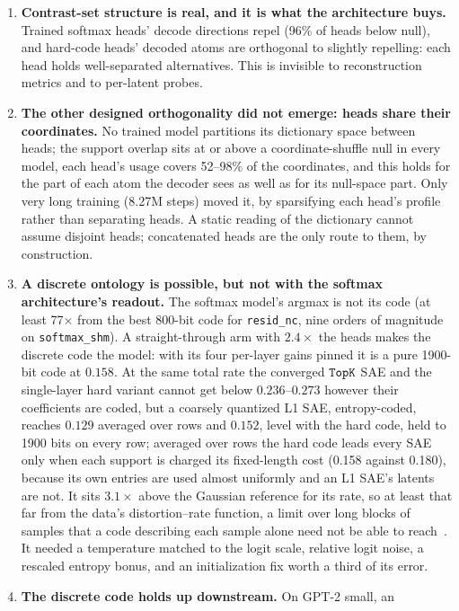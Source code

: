 \begin{enumerate}
\item \textbf{Contrast-set structure is real, and it is what the
architecture buys.} Trained softmax heads' decode directions repel (96\%
of heads below null), and hard-code heads' decoded atoms are orthogonal
to slightly repelling: each head holds well-separated alternatives. This
is invisible to reconstruction metrics and to per-latent probes.
\item \textbf{The other designed orthogonality did not emerge: heads share
their coordinates.} No trained model partitions its dictionary space
between heads; the support overlap sits at or above a coordinate-shuffle
null in every model, each head's usage covers 52--98\% of the coordinates,
and this holds for the part of each atom the decoder sees as well as for
its null-space part. Only very long training (8.27M steps) moved it, by
sparsifying each head's profile rather than separating heads. A static
reading of the dictionary cannot assume disjoint heads; concatenated heads
are the only route to them, by construction.
\item \textbf{A discrete ontology is possible, but not with the softmax
architecture's readout.} The softmax model's argmax is not its code (at
least 77$\times$ from the best 800-bit code for \texttt{resid\_nc}, nine
orders of magnitude on \texttt{softmax\_shm}). A straight-through arm
with $2.4\times$ the heads makes the discrete code the model: with its
four per-layer gains pinned it is a pure 1900-bit code at $0.158$. At the
same total rate the converged $\mathop{\mathtt{TopK}}\limits$ SAE and the single-layer hard
variant cannot get below $0.236$--$0.273$ however their coefficients are
coded, but a coarsely quantized L1 SAE, entropy-coded, reaches $0.129$
averaged over rows and $0.152$, level with the hard code, held to 1900
bits on every row; averaged over rows the hard code leads every SAE only
when each support is charged its fixed-length cost (0.158 against 0.180),
because its own entries are used almost uniformly and an L1 SAE's latents
are not.
It sits $3.1\times$ above the Gaussian reference for its rate, so at least
that far from the data's distortion--rate function, a limit over long
blocks of samples that a code describing each sample alone need not be
able to reach~\cite{cover2006}. It needed a
temperature matched to the logit scale, relative logit noise, a rescaled
entropy bonus, and an initialization fix worth a third of its error.
\item \textbf{The discrete code holds up downstream.} On GPT-2 small, an

\end{enumerate}
